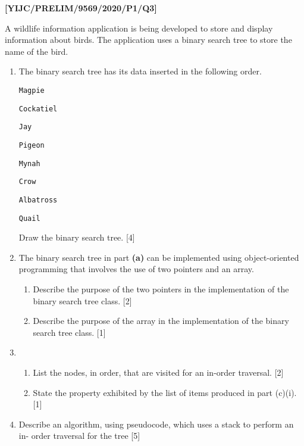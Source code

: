 \item \textbf{{[}YIJC/PRELIM/9569/2020/P1/Q3{]} }

A wildlife information application is being developed to store and
display information about birds. The application uses a binary search
tree to store the name of the bird. 
\begin{enumerate}
\item The binary search tree has its data inserted in the following order. 

\texttt{Magpie }

\texttt{Cockatiel }

\texttt{Jay }

\texttt{Pigeon }

\texttt{Mynah }

\texttt{Crow }

\texttt{Albatross }

\texttt{Quail }

Draw the binary search tree. \hfill{}{[}4{]}
\item The binary search tree in part \textbf{(a)} can be implemented using
object-oriented programming that involves the use of two pointers
and an array. 
\begin{enumerate}
\item Describe the purpose of the two pointers in the implementation of
the binary search tree class. \hfill{} {[}2{]}
\item Describe the purpose of the array in the implementation of the binary
search tree class. \hfill{}{[}1{]}
\end{enumerate}
\item {}
\begin{enumerate}
\item List the nodes, in order, that are visited for an in-order traversal.
\hfill{}{[}2{]}
\item State the property exhibited by the list of items produced in part
(c)(i). \hfill{}{[}1{]}
\end{enumerate}
\item Describe an algorithm, using pseudocode, which uses a stack to perform
an in- order traversal for the tree \hfill{} {[}5{]}
\end{enumerate}